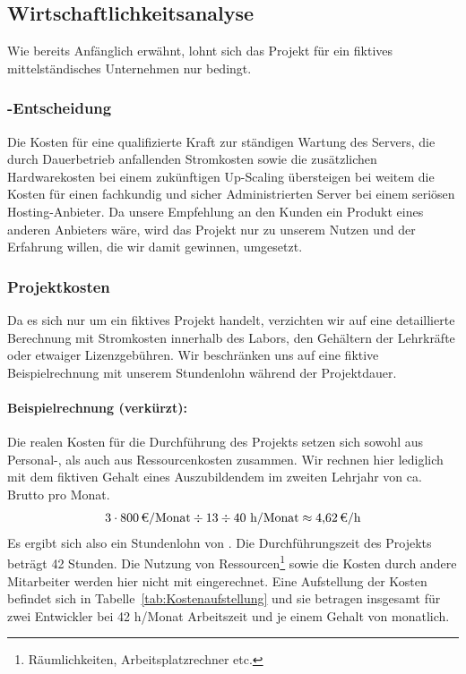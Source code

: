 \subsection{Wirtschaftlichkeitsanalyse}
\label{sec:Wirtschaftlichkeitsanalyse}
Wie bereits Anfänglich erwähnt, lohnt sich das Projekt für ein fiktives mittelständisches Unternehmen nur bedingt.
\subsubsection{-Entscheidung}
\label{sec:MakeOrBuyEntscheidung}
Die Kosten für eine qualifizierte Kraft zur ständigen Wartung des Servers, die durch Dauerbetrieb anfallenden Stromkosten sowie die zusätzlichen Hardwarekosten bei einem zukünftigen Up-Scaling übersteigen bei weitem die Kosten für einen fachkundig und sicher Administrierten Server bei einem seriösen Hosting-Anbieter.
Da unsere Empfehlung an den Kunden ein Produkt eines anderen Anbieters wäre, wird das Projekt nur zu unserem Nutzen und der Erfahrung willen, die wir damit gewinnen, umgesetzt.
\subsubsection{Projektkosten}
\label{sec:Projektkosten}
Da es sich nur um ein fiktives Projekt handelt, verzichten wir auf eine detaillierte Berechnung mit Stromkosten innerhalb des Labors, den Gehältern der Lehrkräfte oder etwaiger Lizenzgebühren. Wir beschränken uns auf eine fiktive Beispielrechnung mit unserem Stundenlohn während der Projektdauer.
\paragraph*{Beispielrechnung (verkürzt): } Die realen Kosten für die Durchführung des Projekts setzen sich sowohl aus Personal-, als auch aus Ressourcenkosten zusammen. Wir rechnen hier lediglich mit dem fiktiven Gehalt eines Auszubildendem im zweiten Lehrjahr von ca.  Brutto pro Monat. 
\begin{eqnarray}
3\cdot \eur{800}\mbox{/Monat} \div {13} \div 40 \mbox{ h/Monat} \approx \eur{4,62}\mbox{/h}
\end{eqnarray}
Es ergibt sich also ein Stundenlohn von . Die Durchführungszeit des Projekts beträgt 42 Stunden. Die Nutzung von Ressourcen\footnote{Räumlichkeiten, Arbeitsplatzrechner etc.} sowie die Kosten durch andere Mitarbeiter werden hier nicht mit eingerechnet. Eine Aufstellung der Kosten befindet sich in Tabelle~\ref{tab:Kostenaufstellung} und sie betragen insgesamt  für zwei Entwickler bei 42 h/Monat Arbeitszeit und je einem Gehalt von  monatlich.

